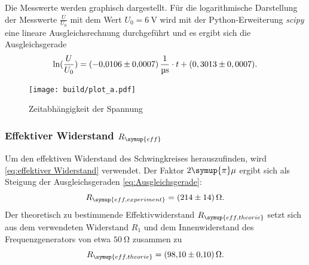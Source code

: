 Die Messwerte werden graphisch dargestellt. Für die logarithmische Darstellung der Messwerte $\frac{U}{U_0}$ mit dem Wert $U_0=\qty{6}{\volt}$
wird mit der Python-Erweiterung \textit{scipy} \cite{scipy} eine lineare Ausgleichsrechnung durchgeführt und es ergibt sich die Ausgleichsgerade
\begin{equation}
  \ln(\frac{U}{U_0})=\qty{-0,0106+-0,0007}{\per\micro\second} \cdot t + (0,3013\pm0,0007).
  \label{eq:Ausgleichsgerade}
\end{equation}

\begin{figure} [H]
  \centering
  \texttt{[image: build/plot\_a.pdf]}
  \caption{Zeitabhängigkeit der Spannung}
  \label{fig:plot_a}
\end{figure}

\subsubsection{Effektiver Widerstand $R_{\symup{eff}}$}
Um den effektiven Widerstand des Schwingkreises herauszufinden, wird \eqref{eq:effektiver Widerstand} verwendet. Der Faktor $2\symup{\pi}\mu$ ergibt
sich als Steigung der Ausgleichsgeraden \eqref{eq:Ausgleichsgerade}:
\begin{equation*}
  R_{\symup{eff, experiment}}=\qty{214+-14}{\ohm}.
\end{equation*}
Der theoretisch zu bestimmende Effektivwiderstand $R_{\symup{eff, theorie}}$ setzt sich aus dem verwendeten Widerstand $R_1$ und dem
Innenwiderstand des Frequenzgenerators von etwa $\qty{50}{\ohm}$ zusammen zu
\begin{equation*}
  R_{\symup{eff, theorie}} = \qty{98.10+-0.10}{\ohm}.
\end{equation*}

